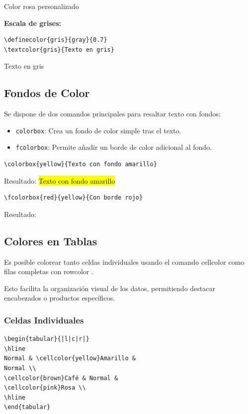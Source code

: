\textcolor{micolor}{Color rosa personalizado}

\textbf{Escala de grises:}
\begin{verbatim}
\definecolor{gris}{gray}{0.7}
\textcolor{gris}{Texto en gris}
\end{verbatim}

\textcolor{gris}{Texto en gris}

\subsection{Fondos de Color}
Se dispone de dos comandos principales para resaltar texto con fondos:

\begin{itemize}
    \item \texttt{colorbox}: Crea un fondo de color simple tras el texto.
    \item \texttt{fcolorbox}: Permite añadir un borde de color adicional al fondo.
\end{itemize}

\begin{verbatim}
\colorbox{yellow}{Texto con fondo amarillo}
\end{verbatim}

Resultado: \colorbox{yellow}{Texto con fondo amarillo} 


\begin{verbatim}
\fcolorbox{red}{yellow}{Con borde rojo}
\end{verbatim}

Resultado:  

\subsection{Colores en Tablas}
Es posible colorear tanto celdas individuales usando el comando cellcolor como filas completas con rowcolor \cite{latex_fontguide}. 

Esto facilita la organización visual de los datos, permitiendo destacar encabezados o productos específicos.

\subsubsection{Celdas Individuales}
\begin{verbatim}
\begin{tabular}{|l|c|r|}
\hline
Normal & \cellcolor{yellow}Amarillo &
Normal \\
\cellcolor{brown}Café & Normal &
\cellcolor{pink}Rosa \\
\hline
\end{tabular}
\end{verbatim}

